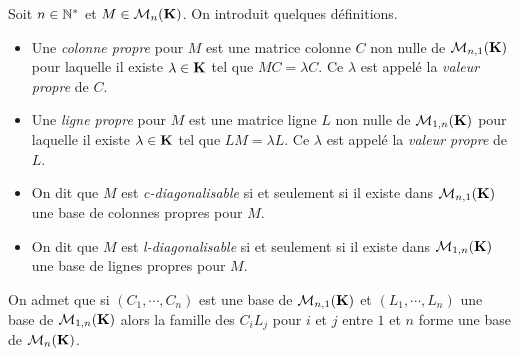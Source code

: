 Soit $n\in \mathbb{N}^*$ et $M\in \mathcal{M}_n(\mathbf{K})$. On introduit quelques définitions.
\begin{itemize}
 \item Une \emph{colonne propre} pour $M$ est une matrice colonne $C$ non nulle de $\mathcal{M}_{n,1}(\mathbf{K})$ pour laquelle il existe $\lambda\in \mathbf{K}$ tel que $MC=\lambda C$. Ce $\lambda$ est appelé la \emph{valeur propre} de $C$.
 \item Une \emph{ligne propre} pour $M$ est une matrice ligne $L$ non nulle de $\mathcal{M}_{1,n}(\mathbf{K})$ pour laquelle il existe $\lambda\in \mathbf{K}$ tel que $LM=\lambda L$. Ce $\lambda$ est appelé la \emph{valeur propre} de $L$.
 \item On dit que $M$ est \emph{c-diagonalisable} si et seulement si il existe dans $\mathcal{M}_{n,1}(\mathbf{K})$ une base de colonnes propres pour $M$.
 \item On dit que $M$ est \emph{l-diagonalisable} si et seulement si il existe dans $\mathcal{M}_{1,n}(\mathbf{K})$ une base de lignes propres pour $M$.
\end{itemize}
On admet que si $(C_1,\cdots,C_n)$ est une base de $\mathcal{M}_{n,1}(\mathbf{K})$ et $(L_1,\cdots,L_n)$ une base de $\mathcal{M}_{1,n}(\mathbf{K})$ alors la famille des $C_iL_j$ pour $i$ et $j$ entre $1$ et $n$ forme une base de $\mathcal{M}_{n}(\mathbf{K})$.
